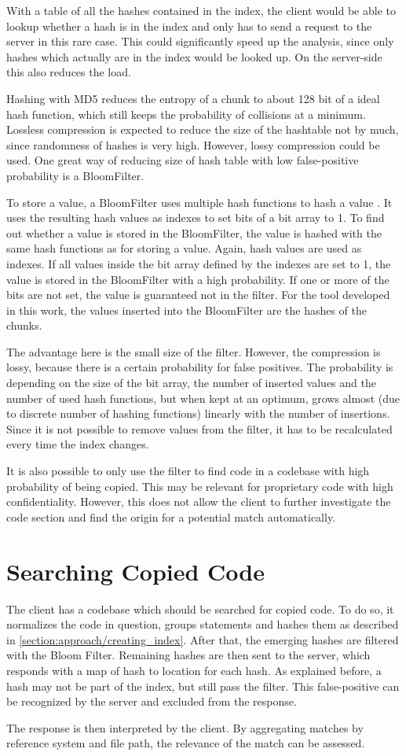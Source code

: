With a table of all the hashes contained in the index, the client would be able to lookup whether a hash is in the index and only has to send a request to the server in this rare case.
This could significantly speed up the analysis, since only hashes which actually are in the index would be looked up.
On the server-side this also reduces the load.

Hashing with MD5 reduces the entropy of a chunk to about 128 bit of a ideal hash function, which still keeps the probability of collisions at a minimum.
Lossless compression is expected to reduce the size of the hashtable not by much, since randomness of hashes is very high.
However, lossy compression could be used.
One great way of reducing size of hash table with low false-positive probability is a BloomFilter.

To store a value, a BloomFilter uses multiple hash functions to hash a value \cite{bloom1970filter}.
It uses the resulting hash values as indexes to set bits of a bit array to 1.
To find out whether a value is stored in the BloomFilter, the value is hashed with the same hash functions as for storing a value.
Again, hash values are used as indexes.
If all values inside the bit array defined by the indexes are set to 1, the value is stored in the BloomFilter with a high probability.
If one or more of the bits are not set, the value is guaranteed not in the filter.
For the tool developed in this work, the values inserted into the BloomFilter are the hashes of the chunks.

The advantage here is the small size of the filter.
However, the compression is lossy, because there is a certain probability for false positives.
The probability is depending on the size of the bit array, the number of inserted values and the number of used hash functions, but when kept at an optimum, grows almost (due to discrete number of hashing functions) linearly with the number of insertions.
Since it is not possible to remove values from the filter, it has to be recalculated every time the index changes.

It is also possible to only use the filter to find code in a codebase with high probability of being copied.
This may be relevant for proprietary code with high confidentiality.
However, this does not allow the client to further investigate the code section and find the origin for a potential match automatically.
	
\section{Searching Copied Code}\label{section:approach/searching_copied_code}
The client has a codebase which should be searched for copied code.
To do so, it normalizes the code in question, groups statements and hashes them as described in \autoref{section:approach/creating_index}.
After that, the emerging hashes are filtered with the Bloom Filter.
Remaining hashes are then sent to the server, which responds with a map of hash to location for each hash.
As explained before, a hash may not be part of the index, but still pass the filter.
This false-positive can be recognized by the server and excluded from the response.

The response is then interpreted by the client.
By aggregating matches by reference system and file path, the relevance of the match can be assessed.


